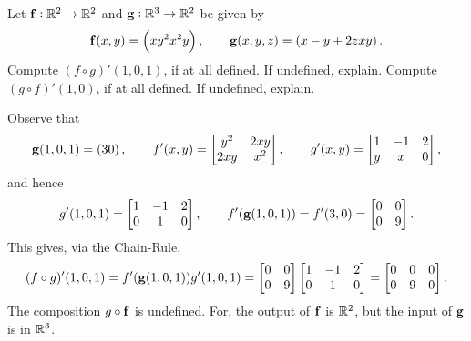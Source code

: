 \begin{multicols}{2}
\begin{problem}
Let $\mathbf{ f}:\mathbb{R}^2\rightarrow \mathbb{R}^2$ and $\mathbf{ g}:\mathbb{R}^3 \rightarrow
\mathbb{R}^2$ be given by $$\mathbf{ f}(x,y) = \left( xy^2 \\ x^2y \right), \qquad
\mathbf{ g}(x,y,z) = \left( x-y+2z \\ xy \right).
$$
Compute $(f\circ g)'(1,0,1)$, if at all defined. If undefined,
explain.  Compute $(g\circ f)'(1,0)$, if at all defined. If
undefined, explain.
\begin{answer}
Observe that
$$\mathbf{ g}(1,0,1) = \left( 3 \\ 0 \right), \qquad f'(x,y) = \begin{bmatrix} y^2 &
2xy \cr 2xy & x^2
\end{bmatrix}, \qquad g'(x,y) =\begin{bmatrix} 1 & -1 & 2  \cr y & x & 0
\cr
\end{bmatrix},  $$
and hence
$$ g'(1,0,1) = \begin{bmatrix} 1 & -1 & 2  \cr 0 & 1 & 0
\cr
\end{bmatrix},\qquad  f'(\mathbf{ g}(1,0,1)) =  f'(3,0) = \begin{bmatrix} 0  &  0  \cr 0 & 9
\cr
\end{bmatrix}. $$This gives, via the Chain-Rule,
$$(f\circ g)'(1,0,1)  = f'(\mathbf{ g}(1,0,1))g'(1,0,1) = \begin{bmatrix} 0  &  0  \cr 0 & 9
\cr
\end{bmatrix}\begin{bmatrix} 1 & -1 & 2  \cr 0 & 1 & 0
\cr
\end{bmatrix} = \begin{bmatrix} 0 & 0 & 0  \cr 0 & 9 & 0
\cr
\end{bmatrix}. $$
The composition $g\circ \mathbf{ f}$ is undefined. For, the output of $\mathbf{ f}$ is
$\mathbb{R}^2$, but the input of $\mathbf{ g}$ is in $\mathbb{R}^3$.

\end{answer}


\end{problem}


\end{multicols}
